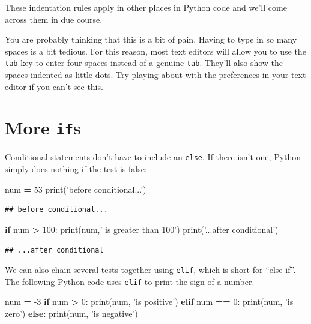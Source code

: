 \documentclass[]{book}
\newenvironment{Shaded}{\begin{snugshade}}{\end{snugshade}}
\newcommand{\BuiltInTok}[1]{#1}
\newcommand{\ControlFlowTok}[1]{\textcolor[rgb]{0.13,0.29,0.53}{\textbf{#1}}}
\newcommand{\DecValTok}[1]{\textcolor[rgb]{0.00,0.00,0.81}{#1}}
\newcommand{\NormalTok}[1]{#1}
\newcommand{\OperatorTok}[1]{\textcolor[rgb]{0.81,0.36,0.00}{\textbf{#1}}}
\newcommand{\StringTok}[1]{\textcolor[rgb]{0.31,0.60,0.02}{#1}}
\theoremstyle{definition}
\theoremstyle{definition}
\theoremstyle{definition}
\theoremstyle{remark}
\let\BeginKnitrBlock\begin \let\EndKnitrBlock\end
\begin{document}
These indentation rules apply in other places in Python code and we'll
come across them in due course.

\BeginKnitrBlock{reader}
You are probably thinking that this is a bit of pain. Having to type in
so many spaces is a bit tedious. For this reason, most text editors will
allow you to use the \texttt{tab} key to enter four spaces instead of a
genuine \texttt{tab}. They'll also show the spaces indented as little
dots. Try playing about with the preferences in your text editor if you
can't see this.
\EndKnitrBlock{reader}

\hypertarget{more-ifs}{%
\section{\texorpdfstring{More \texttt{if}s}{More ifs}}\label{more-ifs}}

Conditional statements don't have to include an \texttt{else}. If there
isn't one, Python simply does nothing if the test is false:

\begin{Shaded}
\begin{Highlighting}[]
\NormalTok{num }\OperatorTok{=} \DecValTok{53}
\BuiltInTok{print}\NormalTok{(}\StringTok{'before conditional...'}\NormalTok{)}
\end{Highlighting}
\end{Shaded}

\begin{verbatim}
## before conditional...
\end{verbatim}

\begin{Shaded}
\begin{Highlighting}[]
\ControlFlowTok{if}\NormalTok{ num }\OperatorTok{>} \DecValTok{100}\NormalTok{:}
    \BuiltInTok{print}\NormalTok{(num,}\StringTok{' is greater than 100'}\NormalTok{)}
\BuiltInTok{print}\NormalTok{(}\StringTok{'...after conditional'}\NormalTok{)}
\end{Highlighting}
\end{Shaded}

\begin{verbatim}
## ...after conditional
\end{verbatim}

We can also chain several tests together using \texttt{elif}, which is
short for ``else if''. The following Python code uses \texttt{elif} to
print the sign of a number.

\begin{Shaded}
\begin{Highlighting}[]
\NormalTok{num }\OperatorTok{=} \DecValTok{-3}
\ControlFlowTok{if}\NormalTok{ num }\OperatorTok{>} \DecValTok{0}\NormalTok{:}
    \BuiltInTok{print}\NormalTok{(num, }\StringTok{'is positive'}\NormalTok{)}
\ControlFlowTok{elif}\NormalTok{ num }\OperatorTok{==} \DecValTok{0}\NormalTok{:}
    \BuiltInTok{print}\NormalTok{(num, }\StringTok{'is zero'}\NormalTok{)}
\ControlFlowTok{else}\NormalTok{:}
    \BuiltInTok{print}\NormalTok{(num, }\StringTok{'is negative'}\NormalTok{)}
\end{Highlighting}
\end{Shaded}
\end{document}

